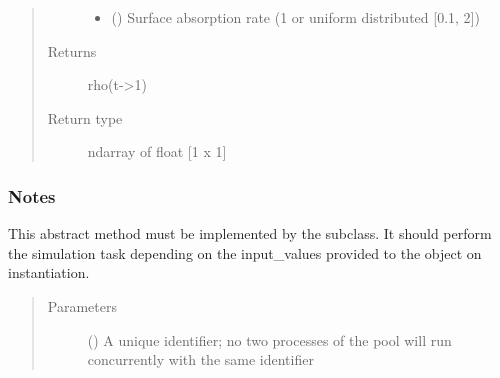 \documentclass[letterpaper,10pt,english,openany,oneside]{sphinxmanual}
\begin{document}
\begin{fulllineitems}
\begin{quote}
\begin{description}
\begin{itemize}
\item {} 
\sphinxstyleliteralstrong{\sphinxupquote{{[}}}\sphinxstyleliteralstrong{\sphinxupquote{{]}}} (\sphinxstyleliteralemphasis{\sphinxupquote{ {[}}}\sphinxstyleliteralemphasis{\sphinxupquote{{]}}}) \textendash{} Surface absorption rate (1 or uniform distributed {[}0.1, 2{]})

\end{itemize}

\item[{Returns}] \leavevmode
{} \textendash{} rho(t-\textgreater{}1)

\item[{Return type}] \leavevmode
ndarray of float {[}1 x 1{]}

\end{description}\end{quote}
\subsubsection*{Notes}

\begin{figure}[htbp]
\centering

\noindent{}
\end{figure}

\begin{fulllineitems}
\label{\detokenize{pygpc.testfunctions:pygpc.testfunctions.testfunctions.SurfaceCoverageSpecies.simulate}}
This abstract method must be implemented by the subclass.
It should perform the simulation task depending on the input\_values provided to the object on instantiation.
\begin{quote}\begin{description}
\item[{Parameters}] \leavevmode
{} () \textendash{} A unique identifier; no two processes of the pool will run concurrently with the same identifier

\end{description}\end{quote}


\end{fulllineitems}
\end{fulllineitems}
\end{document}
